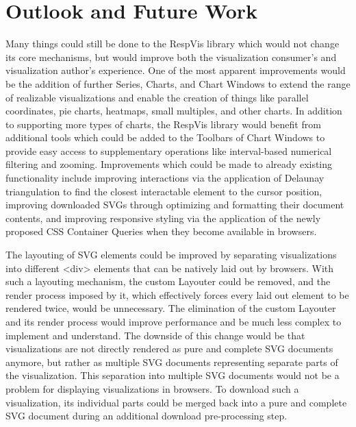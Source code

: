 \chapter{Outlook and Future Work}
\label{chap:Outlook}

Many things could still be done to the RespVis library which would not
change its core mechanisms, but would improve both the visualization
consumer's and visualization author's experience. One of the most
apparent improvements would be the addition of further Series, Charts,
and Chart Windows to extend the range of realizable visualizations and
enable the creation of things like parallel coordinates, pie charts,
heatmaps, small multiples, and other charts. In addition to supporting
more types of charts, the RespVis library would benefit from
additional tools which could be added to the Toolbars of Chart Windows
to provide easy access to supplementary operations like interval-based
numerical filtering and zooming.
%
Improvements which could be made to already existing functionality
include improving interactions via the application of Delaunay
triangulation \parencite{Delaunay,DelaunayAlgorithms} to find the
closest interactable element to the cursor position, improving
downloaded SVGs through optimizing and formatting their document
contents, and improving responsive styling via the application of the
newly proposed CSS Container Queries \parencite{CSSContainment3} when
they become available in browsers.

The layouting of SVG elements could be improved by separating
visualizations into different <div> elements that can be natively laid
out by browsers. With such a layouting mechanism, the custom Layouter
could be removed, and the render process imposed by it, which
effectively forces every laid out element to be rendered twice, would
be unnecessary. The elimination of the custom Layouter and its render
process would improve performance and be much less complex to
implement and understand. The downside of this change would be that
visualizations are not directly rendered as pure and complete SVG
documents anymore, but rather as multiple SVG documents representing
separate parts of the visualization. This separation into multiple SVG
documents would not be a problem for displaying visualizations in
browsers. To download such a visualization, its individual parts could
be merged back into a pure and complete SVG document during an
additional download pre-processing step.

